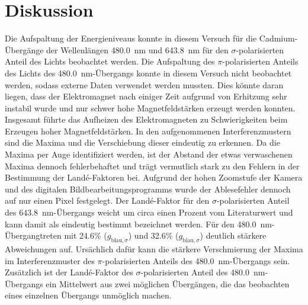 \newpage
\section{Diskussion}
    Die Aufspaltung der Energieniveaus konnte in diesem Versuch für die Cadmium-Übergänge der Wellenlängen \SI{480.0}{\nano\metre} und \SI{643.8}{\nano\metre} für den $\sigma$-polarisierten Anteil des Lichts 
    beobachtet werden. Die Aufspaltung des $\pi$-polarisierten Anteils des Lichts des \SI{480.0}{\nano\metre}-Übergangs konnte in diesem Versuch nicht beobachtet werden, sodass externe Daten verwendet werden 
    mussten. Dies könnte daran liegen, dass der Elektromagnet nach einiger Zeit aufgrund von Erhitzung sehr instabil wurde und nur schwer hohe Magnetfeldstärken erzeugt werden konnten. Insgesamt führte das
    Aufheizen des Elektromagneten zu Schwierigkeiten beim Erzeugen hoher Magnetfeldstärken.\newline 
    In den aufgenommenen Interferenzmustern sind die Maxima und die Verschiebung dieser eindeutig zu erkennen. Da die 
    Maxima per Auge identifiziert werden, ist der Abstand der etwas verwaschenen Maxima dennoch fehlerbehaftet und trägt vermutlich stark zu den Fehlern in der Bestimmung der Landé-Faktoren bei. 
    Aufgrund der hohen Zoomstufe der Kamera und des digitalen Bildbearbeitungsprogramms wurde der Ablesefehler dennoch auf nur einen Pixel festgelegt.\newline
    Der Landé-Faktor für den $\sigma$-polarisierten Anteil des
    \SI{643.8}{\nano\metre}-Übergangs weicht um circa einen Prozent vom Literaturwert und kann damit als eindeutig bestimmt bezeichnet werden. Für den \SI{480.0}{\nano\metre}-Übergangtreten mit \num{24.6}\% 
    ($g_{\text{blau}, \sigma}$) und \num{32.6}\% ($g_{\text{blau}, \sigma}$) deutlich stärkere Abweichungen auf. Ursächlich dafür kann die stärkere Verschmierung der Maxima im Interferenzmuster des 
    $\pi$-polarisierten Anteils des \SI{480.0}{\nano\metre}-Übergangs sein. Zusätzlich ist der Landé-Faktor des $\sigma$-polarisierten Anteil des \SI{480.0}{\nano\metre}-Übergangs ein Mittelwert aus zwei 
    möglichen Übergängen, die das beobachten eines einzelnen Übergangs unmöglich machen. 


